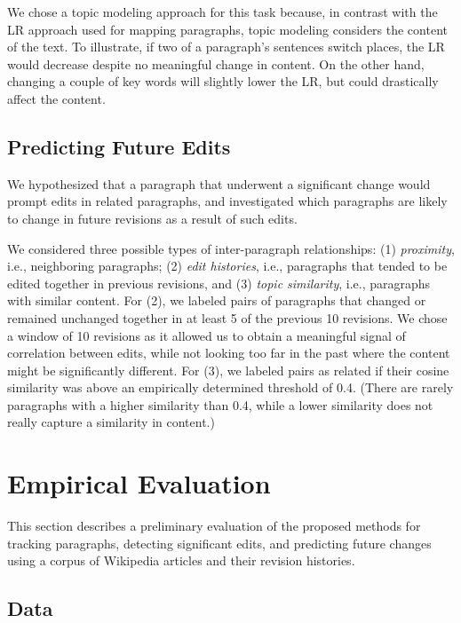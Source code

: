We chose a topic modeling approach for this task because, in contrast
with the LR approach used for mapping paragraphs, topic modeling
considers the content of the text. To illustrate, if two of a
paragraph's sentences switch places, the LR would decrease despite no
meaningful change in content. On the other hand, changing a couple of
key words will slightly lower the LR, but could drastically affect the
content.

\subsection{Predicting Future Edits}\label{predicting-future-edits}

We hypothesized that a paragraph that underwent a significant change
would prompt edits in related paragraphs, and investigated which
paragraphs are likely to change in future revisions as a result of such
edits.

We considered three possible types of inter-paragraph relationships: (1)
\emph{proximity}, i.e., neighboring paragraphs; (2) \emph{edit
histories}, i.e., paragraphs that tended to be edited together in
previous revisions, and (3) \emph{topic similarity}, i.e., paragraphs
with similar content. For (2), we labeled pairs of paragraphs that
changed or remained unchanged together in at least 5 of the previous 10
revisions. We chose a window of 10 revisions as it allowed us to obtain
a meaningful signal of correlation between edits, while not looking too
far in the past where the content might be significantly different. For
(3), we labeled pairs as related if their cosine similarity was above an
empirically determined threshold of 0.4. (There are rarely paragraphs
with a higher similarity than 0.4, while a lower similarity does not
really capture a similarity in content.)

\section{Empirical Evaluation}\label{empirical-evaluation}

This section describes a preliminary evaluation of the proposed methods
for tracking paragraphs, detecting significant edits, and predicting
future changes using a corpus of Wikipedia articles and their revision
histories.

\subsection{Data}\label{data}


